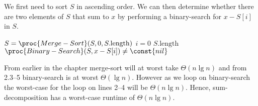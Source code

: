 We first need to sort $S$ in ascending order. We can then determine whether there are two elements of $S$ that sum to $x$ by performing a binary-search for $x-S[i]$ in $S$.
\begin{codebox}
	\li $S = \proc{Merge-Sort}(S,0,S.\text{length})$
	\li \For $i=0$ \To $S.\text{length}$
	\li \Do
				\If $\proc{Binary-Search}(S,x-S[i]) \neq \const{nil}$
	\li		\Then
					\Return {}
				\End
			\End
	\li \Return {}
\end{codebox}

From earlier in the chapter merge-sort will at worst take $\Theta(n\lg n)$ and from 2.3--5 binary-search is at worst $\Theta(\lg n)$. However as we loop on binary-search the worst-case for the loop on lines 2--4 will be $\Theta(n\lg n)$. Hence, sum-decomposition has a worst-case runtime of $\Theta(n\lg n)$.
